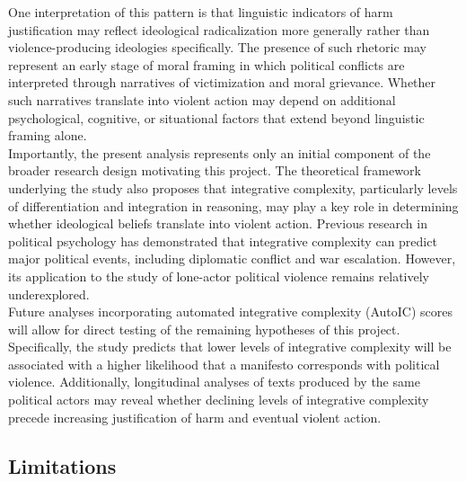 \documentclass[
  english,
  man,floatsintext]{apa6}
\begin{document}
One interpretation of this pattern is that linguistic indicators of harm justification may reflect ideological radicalization more generally rather than violence-producing ideologies specifically. The presence of such rhetoric may represent an early stage of moral framing in which political conflicts are interpreted through narratives of victimization and moral grievance. Whether such narratives translate into violent action may depend on additional psychological, cognitive, or situational factors that extend beyond linguistic framing alone.\\
Importantly, the present analysis represents only an initial component of the broader research design motivating this project. The theoretical framework underlying the study also proposes that integrative complexity, particularly levels of differentiation and integration in reasoning, may play a key role in determining whether ideological beliefs translate into violent action. Previous research in political psychology has demonstrated that integrative complexity can predict major political events, including diplomatic conflict and war escalation. However, its application to the study of lone-actor political violence remains relatively underexplored.\\
Future analyses incorporating automated integrative complexity (AutoIC) scores will allow for direct testing of the remaining hypotheses of this project. Specifically, the study predicts that lower levels of integrative complexity will be associated with a higher likelihood that a manifesto corresponds with political violence. Additionally, longitudinal analyses of texts produced by the same political actors may reveal whether declining levels of integrative complexity precede increasing justification of harm and eventual violent action.

\subsection{Limitations}\label{limitations}
\end{document}
